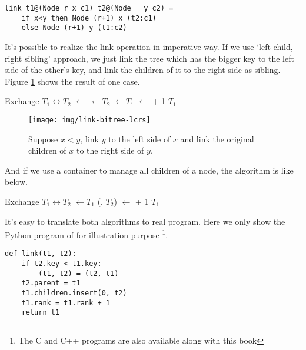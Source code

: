\documentclass{article}
\begin{document}
\lstset{language=Haskell}
\begin{lstlisting}
link t1@(Node r x c1) t2@(Node _ y c2) =
    if x<y then Node (r+1) x (t2:c1)
    else Node (r+1) y (t1:c2)
\end{lstlisting}

It's possible to realize the link operation in imperative way.
If we use `left child, right sibling' approach, we just link
the tree which has the bigger key to the left side of the other's
key, and link the children of it to the right side as sibling.
Figure \ref{fig:link-lcrs} shows the result of one case.

\begin{algorithmic}[1]
    \State Exchange $T_1 \leftrightarrow T_2$
  \EndIf
  \State {} $\gets$ 
  \State {} $\gets T_2$
  \State {} $\gets T_1$
  \State {} $\gets$  + 1
  \State \Return $T_1$
\EndFunction
\end{algorithmic}

\begin{figure}[htbp]
  \centering
  \texttt{[image: img/link-bitree-lcrs]}
  \caption{Suppose $x < y$, link $y$ to the left side of $x$ and link the original children of $x$ to the right side of $y$.} \label{fig:link-lcrs}
\end{figure}

And if we use a container to manage all children of a node, the
algorithm is like below.

\begin{algorithmic}[1]
    \State Exchange $T_1 \leftrightarrow T_2$
  \EndIf
  \State {} $\gets T_1$
  \State {}(, $T_2$)
  \State {} $\gets$  + 1
  \State \Return $T_1$
\EndFunction
\end{algorithmic}

It's easy to translate both algorithms to real program. Here we only show the Python program of  for illustration purpose \footnote{The C and C++ programs are also available along with this book}.

\lstset{language=Python}
\begin{lstlisting}
def link(t1, t2):
    if t2.key < t1.key:
        (t1, t2) = (t2, t1)
    t2.parent = t1
    t1.children.insert(0, t2)
    t1.rank = t1.rank + 1
    return t1
\end{lstlisting}
\end{document}
